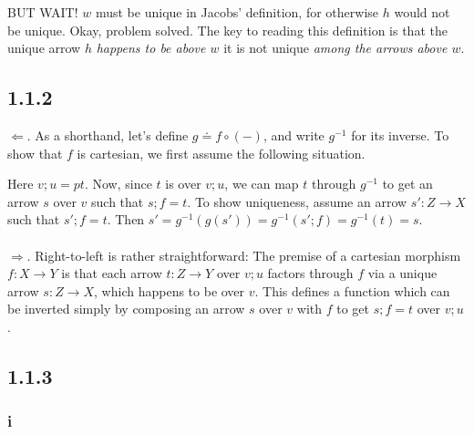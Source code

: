 \documentclass{article}
\begin{document}
BUT WAIT! $w$ must be unique in Jacobs' definition, for otherwise $h$ would not be unique. Okay, problem solved.
The key to reading this definition is that the unique arrow $h$ \emph{happens to be above $w$} it is not unique \emph{among
the arrows above $w$}. 

\subsection*{1.1.2}

$\Leftarrow$. As a shorthand, let's define $g \doteq f \circ (-)$, and write $g^{-1}$ for its inverse.
To show that $f$ is cartesian, we first assume the following situation.


Here $v;u = pt$. Now, since $t$ is over $v;u$, we can map $t$ through $g^{-1}$ to get an arrow
$s$ over $v$ such that $s;f = t$. To show uniqueness, assume an arrow $s' : Z \to X$ such that
$s';f = t$. Then $s' = g^{-1}(g(s')) = g^{-1}(s';f) = g^{-1}(t) = s$.
\\~\\
$\Rightarrow$. Right-to-left is rather straightforward: The premise of a cartesian morphism $f : X \to Y$ is that
each arrow $t : Z \to Y$ over $v;u$ factors through $f$ via a unique arrow $s : Z \to X$, which happens to be over $v$. 
This defines a function which can be inverted simply by composing an arrow $s$ over $v$ with $f$ to get $s;f = t$ over $v;u$.

\subsection*{1.1.3}

\subsubsection*{i} 
\end{document}
